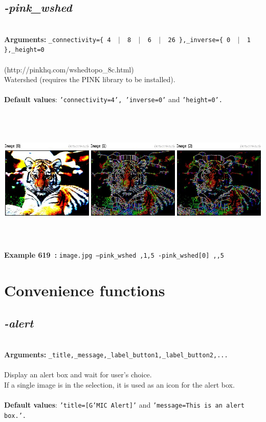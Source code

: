 \documentclass[a4paper,11pt,twoside]{book}
\begin{document}
\subsection{\emph{-pink\_wshed} }\vspace*{-0.5em}
~\\\textbf{Arguments: } 
{\small \texttt{\_connectivity=\{ 4 ~$|$~ 8 ~$|$~ 6 ~$|$~ 26 \},\_inverse=\{ 0 ~$|$~ 1 \},\_height=0}}\\~\\
(http://pinkhq.com/wshedtopo\_8c.html)
~\\Watershed (requires the PINK library to be installed).
~\\~\\\textbf{Default values}: {\small \texttt{'connectivity=4', 'inverse=0'} and \texttt{'height=0'.}}
\begin{center}\includegraphics[keepaspectratio=true,height=7cm,width=\textwidth]{img/gmic_def619.jpg}\\
{\footnotesize \textbf{Example 619~:} \texttt{image.jpg --pink\_wshed ,1,5 -pink\_wshed[0] ,,5}}
\end{center}
\section{Convenience functions}


\subsection{\emph{-alert} }\vspace*{-0.5em}
~\\\textbf{Arguments: } 
{\small \texttt{\_title,\_message,\_label\_button1,\_label\_button2,...}}\\~\\
Display an alert box and wait for user's choice.
~\\If a single image is in the selection, it is used as an icon for the alert box.
~\\~\\\textbf{Default values}: {\small \texttt{'title=[G'MIC Alert]'} and \texttt{'message=This is an alert box.'.}}
\end{document}
